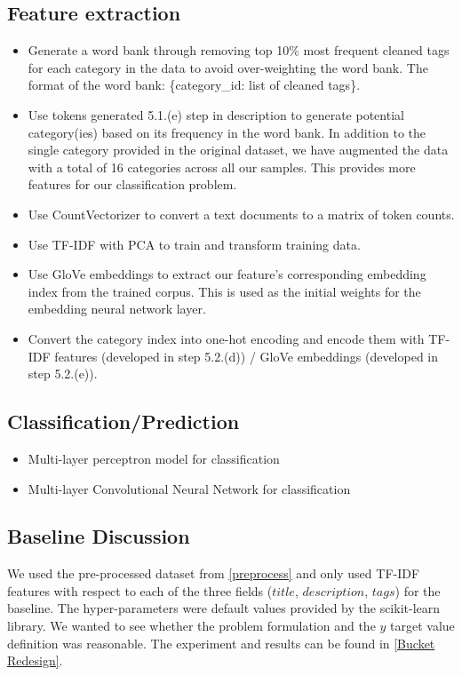 \documentclass[english]{article}
\begin{document}
\begin{enumerate}
    \subsection{Feature extraction}
    \begin{itemize}
    \item Generate a word bank through removing top 10\% most frequent cleaned tags for each category in the data to avoid over-weighting the word bank. The format of the word bank: 
    \{category\_id: list of cleaned tags\}.
    \item Use tokens generated 5.1.(e) step in description to generate potential category(ies) based on its frequency in the word bank. In addition to the single category provided in the original dataset, we have augmented the data with a total of 16 categories across all our samples. This provides more features for our classification problem.
    \item Use CountVectorizer to convert a text documents to a matrix of token counts.
    \item Use TF-IDF with PCA to train and transform training data.
    \item Use GloVe embeddings to extract our feature's corresponding embedding index from the trained corpus. This is used as the initial weights for the embedding neural network layer. 
    \item Convert the category index into one-hot encoding and encode them with TF-IDF features (developed in step 5.2.(d)) / GloVe embeddings (developed in step 5.2.(e)).
    \end{itemize}
    
    \subsection{Classification/Prediction}
    \begin{itemize}
        \item Multi-layer perceptron model for classification
        \item Multi-layer Convolutional Neural Network for classification
    \end{itemize}
    
    \subsection{Baseline Discussion}
    We used the pre-processed dataset from \ref{preprocess} and only used TF-IDF features with respect to each of the three fields ($title$, $description$, $tags$) for the baseline. The hyper-parameters were default values provided by the scikit-learn library. We wanted to see whether the problem formulation and the $y$ target value definition was reasonable. The experiment and results can be found in \ref{Bucket Redesign}.

\end{enumerate}
\end{document}

